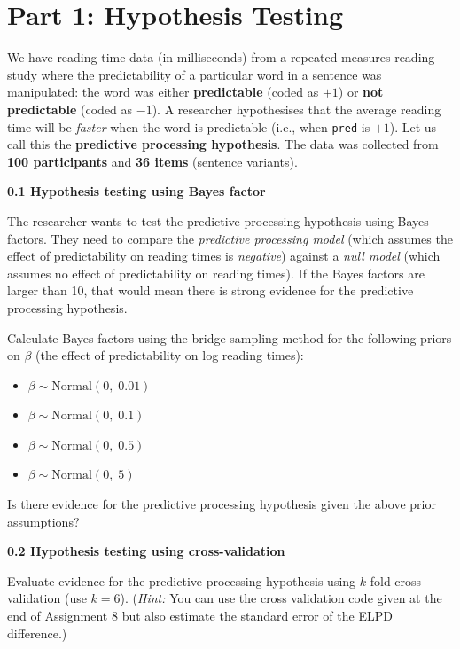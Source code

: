 \documentclass[12pt,a4paper]{article}
\begin{document}
\newpage

\section{Part 1: Hypothesis Testing}

\begin{tcolorbox}[qbox, title={Question}]
We have reading time data (in milliseconds) from a repeated measures reading study where the
predictability of a particular word in a sentence was manipulated: the word was either
\textbf{predictable} (coded as $+1$) or \textbf{not predictable} (coded as $-1$). A researcher
hypothesises that the average reading time will be \emph{faster} when the word is predictable
(i.e., when \texttt{pred} is $+1$). Let us call this the \textbf{predictive processing hypothesis}.
The data was collected from \textbf{100 participants} and \textbf{36 items} (sentence variants).

\medskip
\textbf{0.1 Hypothesis testing using Bayes factor}

The researcher wants to test the predictive processing hypothesis using Bayes factors. They need
to compare the \emph{predictive processing model} (which assumes the effect of predictability on
reading times is \emph{negative}) against a \emph{null model} (which assumes no effect of
predictability on reading times). If the Bayes factors are larger than 10, that would mean there
is strong evidence for the predictive processing hypothesis.

Calculate Bayes factors using the bridge-sampling method for the following priors on $\beta$
(the effect of predictability on log reading times):
\begin{itemize}[noitemsep, leftmargin=1.5cm]
  \item $\beta \sim \mathrm{Normal}(0,\;0.01)$
  \item $\beta \sim \mathrm{Normal}(0,\;0.1)$
  \item $\beta \sim \mathrm{Normal}(0,\;0.5)$
  \item $\beta \sim \mathrm{Normal}(0,\;5)$
\end{itemize}
Is there evidence for the predictive processing hypothesis given the above prior assumptions?

\medskip
\textbf{0.2 Hypothesis testing using cross-validation}

Evaluate evidence for the predictive processing hypothesis using $k$-fold cross-validation
(use $k = 6$). (\textit{Hint:} You can use the cross validation code given at the end of
Assignment 8 but also estimate the standard error of the ELPD difference.)
\end{tcolorbox}
\end{document}
